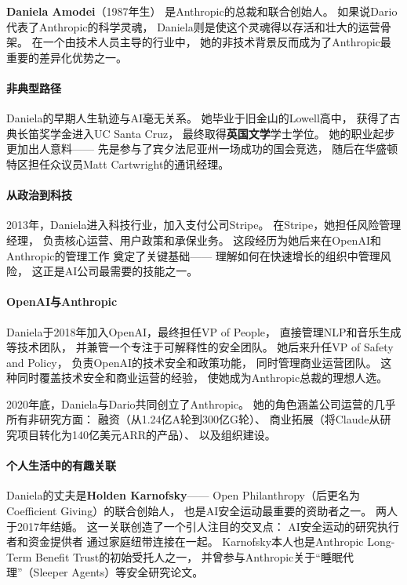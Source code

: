 \textbf{Daniela Amodei}（1987年生）
是Anthropic的总裁和联合创始人。
如果说Dario代表了Anthropic的科学灵魂，
Daniela则是使这个灵魂得以存活和壮大的运营骨架。
在一个由技术人员主导的行业中，
她的非技术背景反而成为了Anthropic最重要的差异化优势之一。

\paragraph{非典型路径}
Daniela的早期人生轨迹与AI毫无关系。
她毕业于旧金山的Lowell高中，
获得了古典长笛奖学金进入UC Santa Cruz，
最终取得\textbf{英国文学}学士学位。
她的职业起步更加出人意料——
先是参与了宾夕法尼亚州一场成功的国会竞选，
随后在华盛顿特区担任众议员Matt Cartwright的通讯经理。

\paragraph{从政治到科技}
2013年，Daniela进入科技行业，加入支付公司Stripe。
在Stripe，她担任风险管理经理，
负责核心运营、用户政策和承保业务。
这段经历为她后来在OpenAI和Anthropic的管理工作
奠定了关键基础——
理解如何在快速增长的组织中管理风险，
这正是AI公司最需要的技能之一。

\paragraph{OpenAI与Anthropic}
Daniela于2018年加入OpenAI，最终担任VP of People，
直接管理NLP和音乐生成等技术团队，
并兼管一个专注于可解释性的安全团队。
她后来升任VP of Safety and Policy，
负责OpenAI的技术安全和政策功能，
同时管理商业运营团队。
这种同时覆盖技术安全和商业运营的经验，
使她成为Anthropic总裁的理想人选。

2020年底，Daniela与Dario共同创立了Anthropic。
她的角色涵盖公司运营的几乎所有非研究方面：
融资（从1.24亿A轮到300亿G轮）、
商业拓展（将Claude从研究项目转化为140亿美元ARR的产品）、
以及组织建设。

\paragraph{个人生活中的有趣关联}
Daniela的丈夫是\textbf{Holden Karnofsky}——
Open Philanthropy（后更名为Coefficient Giving）的联合创始人，
也是AI安全运动最重要的资助者之一。
两人于2017年结婚。
这一关联创造了一个引人注目的交叉点：
AI安全运动的研究执行者和资金提供者
通过家庭纽带连接在一起。
Karnofsky本人也是Anthropic Long-Term Benefit Trust的初始受托人之一，
并曾参与Anthropic关于``睡眠代理''（Sleeper Agents）等安全研究论文。


